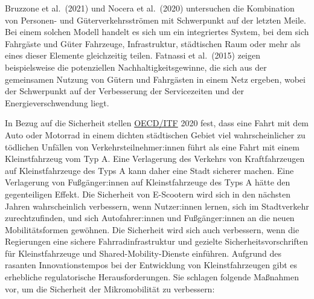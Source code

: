 \documentclass[
]{book}
\begin{document}
Bruzzone et al.~(2021) und Nocera et al.~(2020) untersuchen die Kombination von Personen- und Güterverkehrsströmen mit Schwerpunkt auf der letzten Meile. Bei einem solchen Modell handelt es sich um ein integriertes System, bei dem sich Fahrgäste und Güter Fahrzeuge, Infrastruktur, städtischen Raum oder mehr als eines dieser Elemente gleichzeitig teilen. Fatnassi et al.~(2015) zeigen beispielsweise die potenziellen Nachhaltigkeitsgewinne, die sich aus der gemeinsamen Nutzung von Gütern und Fahrgästen in einem Netz ergeben, wobei der Schwerpunkt auf der Verbesserung der Servicezeiten und der Energieverschwendung liegt.

In Bezug auf die Sicherheit stellen \href{https://www.itf-oecd.org/safe-micromobility}{OECD/ITF} 2020 fest, dass eine Fahrt mit dem Auto oder Motorrad in einem dichten städtischen Gebiet viel wahrscheinlicher zu tödlichen Unfällen von Verkehrsteilnehmer:innen führt als eine Fahrt mit einem Kleinstfahrzeug vom Typ A. Eine Verlagerung des Verkehrs von Kraftfahrzeugen auf Kleinstfahrzeuge des Typs A kann daher eine Stadt sicherer machen. Eine Verlagerung von Fußgänger:innen auf Kleinstfahrzeuge des Typs A hätte den gegenteiligen Effekt. Die Sicherheit von E-Scootern wird sich in den nächsten Jahren wahrscheinlich verbessern, wenn Nutzer:innen lernen, sich im Stadtverkehr zurechtzufinden, und sich Autofahrer:innen und Fußgänger:innen an die neuen Mobilitätsformen gewöhnen. Die Sicherheit wird sich auch verbessern, wenn die Regierungen eine sichere Fahrradinfrastruktur und gezielte Sicherheitsvorschriften für Kleinstfahrzeuge und Shared-Mobility-Dienste einführen. Aufgrund des rasanten Innovationstempos bei der Entwicklung von Kleinstfahrzeugen gibt es erhebliche regulatorische Herausforderungen. Sie schlagen folgende Maßnahmen vor, um die Sicherheit der Mikromobilität zu verbessern:
\end{document}
